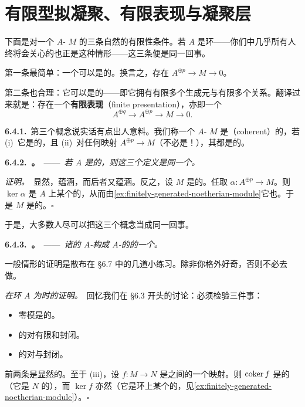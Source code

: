 
\section{有限型拟凝聚、有限表现与凝聚层}

下面是对一个 $A$-\trModule{} $M$ 的三条自然的有限性条件。若 $A$ 是\trNoetherian{}环——你们中几乎所有人终将会关心的也正是这种情形——这三条便是同一回事。

第一条最简单：一个\trModule{}可以是\textbf{\trFinitelyGenerated}的。换言之，存在\trSurjectiveMap{} $A^{\oplus p}\to M\to 0$。

第二条也合理：它可以是\trFinitelyPresented{}的——即它拥有有限多个生成元与有限多个关系。翻译过来就是：存在一个\textbf{有限表现}（finite presentation），亦即一个\trExactSequence
\[
A^{\oplus q}\longrightarrow A^{\oplus p}\longrightarrow M\longrightarrow 0.
\]

\textbf{6.4.1.}\ 第三个概念说实话有点出人意料。我们称一个 $A$-\trModule{} $M$ 是\textbf{\trCoh}（coherent）的，若 (i)~它是\trFinitelyGenerated{}的，且 (ii)~对任何映射 $A^{\oplus p}\to M$（不必是\trSurjectiveMap！），其\trKernel{}都是\trFinitelyGenerated{}的。

\textbf{6.4.2.\ \trhProposition{}。}\ ——\ \emph{若 $A$ 是\trNoetherian{}的，则这三个定义是同一个。}

\emph{证明。}\ 显然，\trCoh{}蕴涵\trFinitelyPresented，而后者又蕴涵\trFinitelyGenerated。反之，设 $M$ 是\trFinitelyGenerated{}的。任取 $\alpha\colon A^{\oplus p}\to M$。则 $\ker\alpha$ 是 $A$ 上某个\trFinitelyGenerated{}\trModule{}的\trSubmodule，从而由\cref{ex:finitely-generated-noetherian-module}它也\trFinitelyGenerated。于是 $M$ 是\trCoh{}的。\hfill$\square$

于是，大多数人尽可以把这三个概念当成同一回事。

\textbf{6.4.3.\ \trhProposition{}。}\ ——\ \emph{诸\trCoh{}的 $A$-\trModule{}构成 $A$-\trModule{}的\trCategory{}的一个\trAbelian\trSubcategory。}

一般情形的证明是散布在 \S6.7 中的几道小练习。除非你格外好奇，否则不必去做。

\emph{在环 $A$ 为\trNoetherian{}时的证明。}\ 回忆我们在 \S6.3 开头的讨论：必须检验三件事：
\begin{itemize}[leftmargin=2.6em,itemsep=2pt,topsep=3pt]
\item[(i)] 零模是\trCoh{}的。
\item[(ii)] \trCoh{}\trModule{}的\trCategory{}对有限和封闭。
\item[(iii)] \trCoh{}\trModule{}的\trCategory{}对\trKernel{}与\trCokernel{}封闭。
\end{itemize}
前两条是显然的。至于 (iii)，设 $f\colon M\to N$ 是\trFinitelyGenerated{}\trModule{}之间的一个映射。则 $\operatorname{coker} f$ 是\trFinitelyGenerated{}的（它是 $N$ 的\trImage），而 $\ker f$ 亦然（它是\trNoetherian{}环上某个\trFinitelyGenerated{}\trModule{}的\trSubmodule，见\cref{ex:finitely-generated-noetherian-module}）。\hfill$\square$


